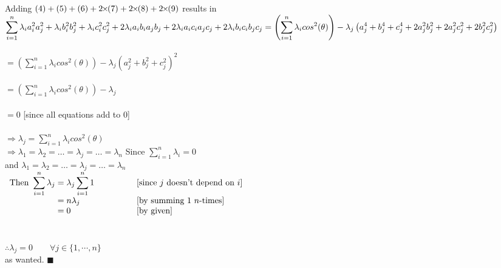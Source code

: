 \documentclass[12pt]{article}
\newcommand{\timesSmall}{{\mkern-2mu\times\mkern-2mu}}
\renewcommand{\qed}{\hfill$\blacksquare$}
\begin{document}
	\\\\
	Adding $(4) +(5)+ (6) + 2\timesSmall(7)+ 2\timesSmall(8)+ 2\timesSmall(9)$ results in\\
$\displaystyle \sum_{i = 1}^{n} \lambda_ia_i^2a_j^2   + \lambda_ib_i^2b_j^2  +\lambda_ic_i^2c_j^2  +2\lambda_ia_ib_ia_jb_j +2\lambda_ia_ic_ia_jc_j +2\lambda_ib_ic_ib_jc_j\\\\
= \left(\sum_{i = 1}^{n} \lambda_i cos^2(\theta)\right) - \lambda_j \left( a_j^4   + b_j^4  +c_j^4  +2a_j^2b_j^2 +2a_j^2c_j^2+2b_j^2c_j^2 \right)$\\\\
$\displaystyle = \left(\sum_{i = 1}^{n} \lambda_i cos^2(\theta)\right) - \lambda_j \left( a_j^2 + b_j^2 + c_j^2 \right)^2$\\\\
$\displaystyle = \left(\sum_{i = 1}^{n} \lambda_i cos^2(\theta)\right) - \lambda_j$ \qquad {}\\\\
	\noindent $=0$ \hspace*{52mm} [since all equations add to 0]
	\\\\
$\displaystyle \Longrightarrow \lambda_j = \sum_{i = 1}^{n} \lambda_i cos^2(\theta)$\\
$\Longrightarrow \lambda_1 = \lambda_2 = \ldots = \lambda_j = \ldots = \lambda_n$
	\newpage
	\noindent Since $\displaystyle \sum_{i = 1}^{n} \lambda_i = 0$\\
	and $\lambda_1 = \lambda_2 = \ldots = \lambda_j = \ldots = \lambda_n$\\
$\begin{array}{r@{}>{\displaystyle}ll}
	\displaystyle \text{Then }\sum_{i = 1}^{n} \lambda_j & {}= \lambda_j \sum_{i = 1}^{n}1 \qquad \qquad & [\text{since $j$ doesn't depend on }i] \\
	                                                     & {}= n\lambda_j                                & [\text{by summing 1 } n \text{-times}] \\
	                                                     & {}= 0                                         & [\text{by given}]                      \\
\end{array}$
	\\\\\\
$\therefore \lambda_j = 0 \qquad \forall j \in \{1, \cdots, n\}$\\
	as wanted. \qed
	\\\\\\\\\\\\\\\\
\end{document}
